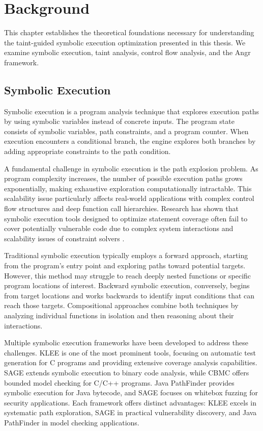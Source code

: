 \chapter{Background}

This chapter establishes the theoretical foundations necessary for understanding the taint-guided symbolic execution optimization presented in this thesis. We examine symbolic execution, taint analysis, control flow analysis, and the Angr framework.

\section{Symbolic Execution}

Symbolic execution is a program analysis technique that explores execution paths by using symbolic variables instead of concrete inputs. The program state consists of symbolic variables, path constraints, and a program counter. When execution encounters a conditional branch, the engine explores both branches by adding appropriate constraints to the path condition.

A fundamental challenge in symbolic execution is the path explosion problem. As program complexity increases, the number of possible execution paths grows exponentially, making exhaustive exploration computationally intractable. This scalability issue particularly affects real-world applications with complex control flow structures and deep function call hierarchies. Research has shown that symbolic execution tools designed to optimize statement coverage often fail to cover potentially vulnerable code due to complex system interactions and scalability issues of constraint solvers \cite{schwartz_all_2010}.

Traditional symbolic execution typically employs a forward approach, starting from the program's entry point and exploring paths toward potential targets. However, this method may struggle to reach deeply nested functions or specific program locations of interest. Backward symbolic execution, conversely, begins from target locations and works backwards to identify input conditions that can reach those targets. Compositional approaches combine both techniques by analyzing individual functions in isolation and then reasoning about their interactions.

Multiple symbolic execution frameworks have been developed to address these challenges. KLEE \cite{cadar_klee_2008} is one of the most prominent tools, focusing on automatic test generation for C programs and providing extensive coverage analysis capabilities. SAGE extends symbolic execution to binary code analysis, while CBMC offers bounded model checking for C/C++ programs. Java PathFinder provides symbolic execution for Java bytecode, and SAGE focuses on whitebox fuzzing for security applications. Each framework offers distinct advantages: KLEE excels in systematic path exploration, SAGE in practical vulnerability discovery, and Java PathFinder in model checking applications.

